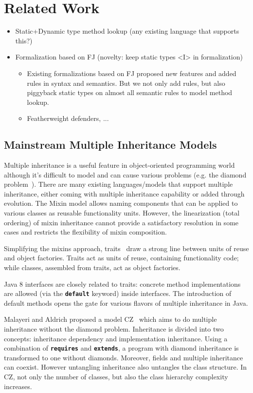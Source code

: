 \section{Related Work}

\begin{itemize}
	\item Static+Dynamic type method lookup (any existing language that supports this?)
	\item Formalization based on FJ (novelty: keep static types <I> in formalization)
		\begin{itemize}
			\item Existing formalizations based on FJ proposed new features and added rules in syntax and semantics. But we not only add rules, but also piggyback static types on almost all semantic rules to model method lookup. 
			\item Featherweight defenders, ...
		\end{itemize}
\end{itemize}

\subsection{Mainstream Multiple Inheritance Models}
Multiple inheritance is a useful feature in object-oriented programming world although it's difficult to model and can 
cause various problems (e.g. the diamond problem~\cite{Sak89dis,Singh1995}).  There are many existing languages/models that support multiple 
inheritance, either coming with multiple inheritance capability or added through evolution. The Mixin model allows naming components 
that can be applied to various classes as reusable functionality units. However, the linearization (total ordering) of mixin 
inheritance cannot provide a satisfactory resolution in some cases and restricts the flexibility of mixin composition. 

Simplifying the mixins approach, traits~\cite{scharli03traits} draw a strong line between units of reuse and object factories. 
Traits act as units of reuse, containing functionality code; while classes, assembled from traits, act as object factories. 

Java 8 interfaces are closely related to traits: concrete method implementations are allowed (via the \textbf{\texttt{default}} keyword) inside interfaces. 
The introduction of default methods opens the gate for various flavors of multiple inheritance in Java.

Malayeri and Aldrich proposed a model CZ~\cite{malayeri2009cz} which aims to do multiple inheritance without the diamond problem. 
Inheritance is divided into two concepts: inheritance dependency and implementation inheritance. 
Using a combination of \textbf{\texttt{requires}} and \textbf{\texttt{extends}}, a program with 
diamond inheritance is transformed to one without diamonds. Moreover, fields and multiple inheritance can coexist. 
However untangling inheritance also untangles the class structure. In CZ, not only the number of classes, but also 
the class hierarchy complexity increases. 

